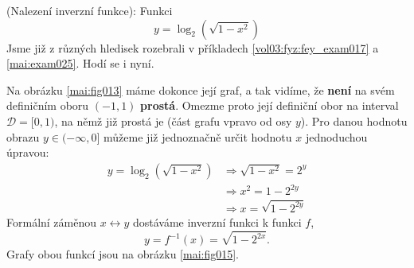 \begin{mdframed}[style=mdexam]
  \begin{example}\label{mai:exam027}
    (Nalezení inverzní funkce): Funkci 
    \begin{equation*}
      y = \log_2(\sqrt{1-x^2})
    \end{equation*}
    Jsme již z různých hledisek rozebrali v příkladech \ref{vol03:fyz:fey_exam017} a
    \ref{mai:exam025}. Hodí se i nyní.

    {\centering
    \captionsetup{type=figure}
    \par}
    
    Na obrázku \ref{mai:fig013} máme dokonce její graf, a tak vidíme, že \textbf{není} na svém 
    definičním oboru \((-1, 1)\) \textbf{prostá}. Omezme proto její definiční obor na interval 
    \(\mathcal{D} = [0, 1)\), na němž již prostá je (část grafu vpravo od osy \(y\)). Pro danou 
    hodnotu obrazu \(y \in (-\infty,0]\) můžeme již jednoznačně určit hodnotu \(x\) jednoduchou 
    úpravou:
    \begin{align*}
      y = \log_2(\sqrt{1-x^2}) &\Rightarrow \sqrt{1-x^2} = 2^y   \\
                               &\Rightarrow x^2 = 1 - 2^{2y}     \\
                               &\Rightarrow x = \sqrt{1 - 2^{2y}}
    \end{align*}
    Formální záměnou \(x \leftrightarrow y\) dostáváme inverzní funkci k funkci \(f\),
    \begin{equation*}
      y =f^{-1}(x) = \sqrt{1 - 2^{2x}}.
    \end{equation*}
    Grafy obou funkcí jsou na obrázku \ref{mai:fig015}.
  \end{example}
\end{mdframed}